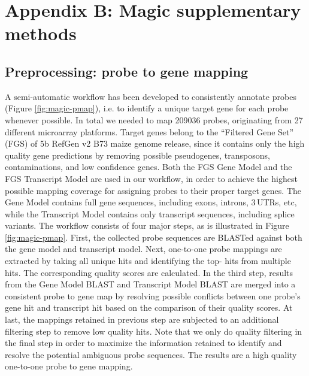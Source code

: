 \chapter{Appendix B: Magic supplementary methods}\label{ch:apd-magic}


\instructionsappendices


\section{Preprocessing: probe to gene mapping}\label{apd:magic-probemap}

%
%

A semi-automatic workflow has been developed to consistently
annotate probes (Figure \ref{fig:magic-pmap}), i.e. to identify a unique target 
gene for each probe whenever possible. In total we needed to map
209036 probes, originating from 27 different microarray
platforms. Target genes belong to the “Filtered Gene Set” (FGS)
of 5b RefGen v2 B73 maize genome release, since it contains only
the high quality gene predictions by removing possible
pseudogenes, transposons, contaminations, and low confidence
genes. Both the FGS Gene Model and the FGS Transcript Model are
used in our workflow, in order to achieve the highest possible
mapping coverage for assigning probes to their proper target
genes. The Gene Model contains full gene sequences, including
exons, introns, 3\textquotesingle\,UTRs, etc, while the Transcript Model 
contains
only transcript sequences, including splice variants. The
workflow consists of four major steps, as is illustrated in
Figure \ref{fig:magic-pmap}. First, the collected probe sequences are BLASTed
against both the gene model and transcript model. Next,
one-to-one probe mappings are extracted by taking all unique hits
and identifying the top- hits from multiple hits. The
corresponding quality scores are calculated. In the third step,
results from the Gene Model BLAST and Transcript Model BLAST are
merged into a consistent probe to gene map by resolving possible
conflicts between one probe’s gene hit and transcript hit based
on the comparison of their quality scores. At last, the mappings
retained in previous step are subjected to an additional
filtering step to remove low quality hits. Note that we only do
quality filtering in the final step in order to maximize the
information retained to identify and resolve the potential
ambiguous probe sequences. The results are a high quality
one-to-one probe to gene mapping.


